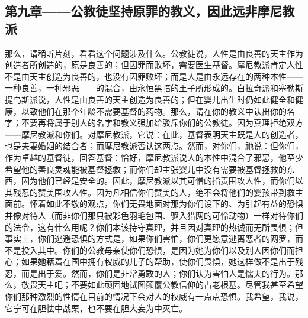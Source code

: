 
\subsection{第九章——公教徒坚持原罪的教义，因此远非摩尼教派}

那么，请稍听片刻，看看这个问题涉及什么。公教徒说，人性是由良善的天主作为创造者所创造的，原是良善的；但因罪而败坏，需要医生基督。摩尼教派肯定人性不是由天主创造为良善的，也没有因罪败坏；而是人是由永远存在的两种本性——一种良善，一种邪恶——的混合，由永恒黑暗的王子所形成的。白拉奇派和塞勒斯提乌斯派说，人性是由良善的天主创造为良善的；但在婴儿出生时仍如此健全和健康，以致他们在那个年龄不需要基督的药物。那么，请在你的教义中认出你的名字；不要再将属于别人的名字和教义强加给驳斥你们的公教徒。因为真理拒绝双方——摩尼教派和你们。对摩尼教派，它说：在此，基督表明天主既是人的创造者，也是夫妻婚姻的结合者；而摩尼教派否认这两点。然而，对你们，祂说：但你们，作为卓越的基督徒，回答基督：恰好，摩尼教派说人的本性中混合了邪恶，他至少希望他的善良灵魂能被基督拯救；而你们却主张婴儿中没有需要被基督拯救的东西，因为他们已经是安全的。因此，摩尼教派以其可憎的指责围攻人性，而你们以其残忍的赞美围攻人性。因为凡相信你们赞美的人，绝不会将他们的婴孩带到救主面前。怀着如此不敬的观点，你们无畏地面对那为你们设下的、为引起有益的恐惧并像对待人（而非你们那只被彩色羽毛包围、驱入猎网的可怜动物）一样对待你们的法令，这有什么用呢？你们本该持守真理，并且因对真理的热诚而无所畏惧；但事实上，你们逃避恐惧的方式是，如果你们害怕，你们更愿意逃离恶者的网罗，而不是投入其中。你们的公教母亲使你们恐惧，是因为她为你们以及别人因你们而担心；如果她藉着在国中拥有权威的儿子的帮助，使你们畏惧，她这样做不是出于残忍，而是出于爱。然而，你们是非常勇敢的人；你们认为害怕人是懦夫的行为。那么，敬畏天主吧；不要如此顽固地试图颠覆公教信仰的古老根基。尽管我甚至希望你们那种激烈的性情在目前的情况下会对人的权威有一点点恐惧。我希望，我说，它宁可在胆怯中战栗，也不要在胆大妄为中灭亡。\par


